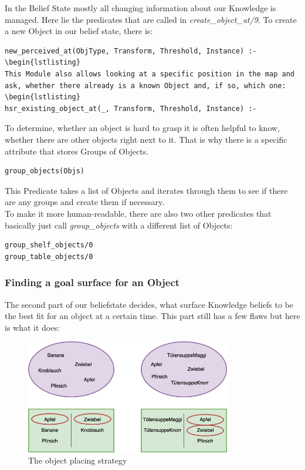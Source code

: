 \documentclass[main.tex]{subfiles}
\begin{document}
In the Belief State mostly all changing information about our Knowledge is managed. Here lie the predicates that are called in \textit{create\_object\_at/9}. To create a new Object in our belief state, there is:
\begin{lstlisting}
new_perceived_at(ObjType, Transform, Threshold, Instance) :-
\begin{lstlisting}
This Module also allows looking at a specific position in the map and ask, whether there already is a known Object and, if so, which one:
\begin{lstlisting}
hsr_existing_object_at(_, Transform, Threshold, Instance) :-
\end{lstlisting}
To determine, whether an object is hard to grasp it is often helpful to know, whether there are other objects right next to it. That is why there is a specific attribute that stores Groups of Objects. 
\begin{lstlisting}
group_objects(Objs)
\end{lstlisting}
This Predicate takes a list of Objects and iterates through them to see if there are any groups and create them if necessary.\\
To make it more human-readable, there are also two other predicates that basically just call \textit{group\_objects} with a different list of Objects:
\begin{lstlisting}
group_shelf_objects/0
group_table_objects/0
\end{lstlisting}

\subsubsection{Finding a goal surface for an Object\label{sec:kn_find_surf}}

The second part of our beliefstate decides, what surface Knowledge beliefs to be the best fit for an object at a certain time. This part still has a few flaws but here is what it does:
\begin{figure}
\centering
\includegraphics[width=0.8\textwidth]{pictures/knowledge/knowledge_placing_objects}
\caption{The object placing strategy}
\label{fig:kn_obj_placement}
\end{figure}
\end{document}
